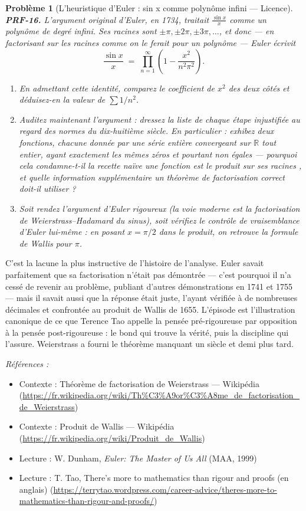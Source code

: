 \documentclass[11pt]{article}
\newtheorem{problem}{Problème}
\newenvironment{refs}{\par\small\noindent\emph{Références :}\begin{itemize}\setlength\itemsep{0pt}}{\end{itemize}\normalsize}
\begin{document}
\bigskip

\begin{problem}[{L'heuristique d'Euler : sin x comme polynôme infini --- Licence}]
\textbf{PRF-16.} L'argument original d'Euler, en 1734, traitait
$ \frac{\sin x}{x} $ comme un polynôme de degré infini. Ses \og{} racines \fg{} sont
$ \pm\pi, \pm 2\pi, \pm 3\pi, \dots $, et donc --- en factorisant sur les racines comme on
le ferait pour un polynôme --- Euler écrivit
\[ \frac{\sin x}{x} \;=\; \prod_{n=1}^{\infty} \left( 1 - \frac{x^2}{n^2 \pi^2} \right). \]
\begin{enumerate}
\item[(a)] En admettant cette identité, comparez le coefficient de $ x^2 $ des deux côtés et
déduisez-en la valeur de $ \sum 1/n^2 $.
\item[(b)] Auditez maintenant l'argument : dressez la liste de chaque étape injustifiée au regard
des normes du dix-huitième siècle. En particulier : exhibez deux fonctions, chacune donnée
par une série entière convergeant sur $\mathbb{R}$ tout entier, ayant exactement les mêmes zéros et
pourtant non égales --- pourquoi cela condamne-t-il la recette naïve \og{} une fonction est le
produit sur ses racines \fg{}, et quelle information supplémentaire un théorème de
factorisation correct doit-il utiliser ?
\item[(c)] Soit rendez l'argument d'Euler rigoureux (la voie moderne est la factorisation de
Weierstrass--Hadamard du sinus), soit vérifiez le contrôle de vraisemblance d'Euler
lui-même : en posant $ x = \pi/2 $ dans le produit, on retrouve la formule de Wallis pour
$\pi$.
\end{enumerate}

\end{problem}

\noindent C'est la lacune la plus instructive de l'histoire de l'analyse. Euler
savait parfaitement que sa factorisation n'était pas démontrée --- c'est pourquoi il n'a cessé
de revenir au problème, publiant d'autres démonstrations en 1741 et 1755 --- mais il savait
aussi que la réponse était juste, l'ayant vérifiée à de nombreuses décimales et confrontée au
produit de Wallis de 1655. L'épisode est l'illustration canonique de ce que Terence Tao
appelle la pensée pré-rigoureuse par opposition à la pensée post-rigoureuse : le bond qui
trouve la vérité, puis la discipline qui l'assure. Weierstrass a fourni le théorème manquant
un siècle et demi plus tard.

\begin{refs}
\item Contexte : Théorème de factorisation de Weierstrass --- Wikipédia (\url{https://fr.wikipedia.org/wiki/Th%C3%A9or%C3%A8me_de_factorisation_de_Weierstrass})
\item Contexte : Produit de Wallis --- Wikipédia (\url{https://fr.wikipedia.org/wiki/Produit_de_Wallis})
\item Lecture : W. Dunham, \textit{Euler: The Master of Us All} (MAA, 1999)
\item Lecture : T. Tao, \og{} There's more to mathematics than rigour and proofs \fg{} (en anglais) (\url{https://terrytao.wordpress.com/career-advice/theres-more-to-mathematics-than-rigour-and-proofs/})
\end{refs}
\end{document}
